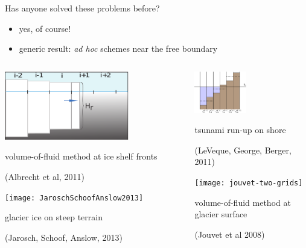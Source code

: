 \documentclass{beamer}
\begin{document}
\begin{frame}{Has anyone solved these problems before?}

\vspace{-2mm}

  \begin{itemize}
  \item yes, of course!
  \item generic result: \emph{ad hoc} schemes near the free boundary
  \end{itemize}

\medskip
\begin{columns}
\begin{column}{0.45\textwidth}
\includegraphics[width=0.7\textwidth,keepaspectratio=true]{Albrechtetal2011half}

\scriptsize volume-of-fluid method at ice shelf fronts

\tiny (Albrecht et al, 2011)

\medskip
\texttt{[image: JaroschSchoofAnslow2013]}

\scriptsize glacier ice on steep terrain

\smallskip
\tiny (Jarosch, Schoof, Anslow, 2013)
\end{column}

\begin{column}{0.5\textwidth}
\hfill \includegraphics[width=0.45\textwidth,keepaspectratio=true]{LeVequeGeorgeBerger2011}

\hfill \scriptsize tsunami run-up on shore

\smallskip
\hfill \tiny (LeVeque, George, Berger, 2011)

\medskip
\hfill \texttt{[image: jouvet-two-grids]}

\hfill \scriptsize volume-of-fluid method at glacier surface

\hfill \tiny (Jouvet et al 2008)
\end{column}
\end{columns}
\end{frame}
\end{document}
